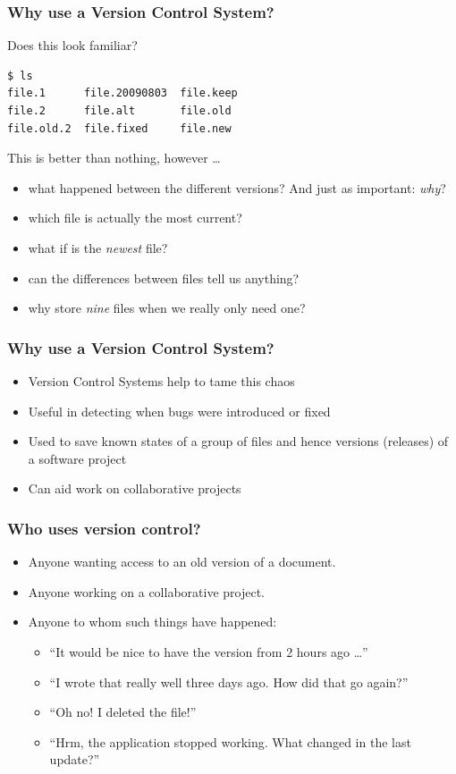 \begin{frame}[fragile]
\frametitle{Why use a Version Control System?}

Does this look familiar?

\begin{lstlisting}
$ ls
file.1      file.20090803  file.keep
file.2      file.alt       file.old
file.old.2  file.fixed     file.new
\end{lstlisting}

This is better than nothing, however \ldots
\begin{itemize}
    \item what happened between the different versions?  And just as
        important: \emph{why}?
    \item which file is actually the most current?
    \item what if  is the \emph{newest} file?
    \item can the differences between files tell us anything?
    \item why store \emph{nine} files when we really only need one?
\end{itemize}
\end{frame}

\begin{frame}
\frametitle{Why use a Version Control System?}
\begin{itemize}
    \item Version Control Systems help to tame this chaos
    \item Useful in detecting when bugs were introduced or fixed
    \item Used to save known states of a group of files and hence versions
        (releases) of a software project
    \item Can aid work on collaborative projects
\end{itemize}
\end{frame}

\begin{frame}
\frametitle{Who uses version control?}
\begin{itemize}
    \item Anyone wanting access to an old version of a document.
    \item Anyone working on a collaborative project.
    \item Anyone to whom such things have happened:
        \begin{itemize}
            \item ``It would be nice to have the version from 2 hours ago \ldots''
            \item ``I wrote that really well three days ago.  How did that
                go again?''
            \item ``Oh no!  I deleted the file!''
            \item ``Hrm, the application stopped working.  What changed in the
                last update?''
        \end{itemize}
\end{itemize}
\end{frame}

